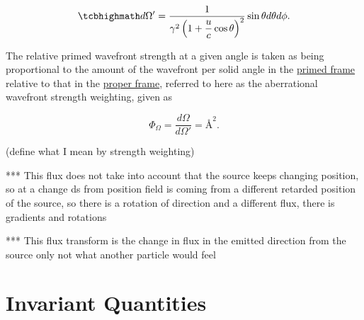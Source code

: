 \begin{equation}
	\mhl{
		d\Omega{'} = \dfrac{1}{{\gamma}^2\left(1 + \dfrac{u}{c}\cos{\theta}\right)^2} \sin{\theta} d\theta d\phi.
	}
\end{equation}

The relative primed wavefront strength at a given angle is taken as being proportional to the amount of the wavefront per solid angle in the \hyperlink{def-Primed-Frame}{primed frame} relative to that in the \hyperlink{def-proper-frame}{proper frame}, referred to here as the aberrational wavefront strength weighting, given as

\begin{equation}
	\label{eq: aberrational wavefront weighting}
	\Phi_\Omega = \frac{d\Omega}{d\Omega'} = \text{\AA}^2.
\end{equation}

(define what I mean by strength weighting)

*** This flux does not take into account that the source keeps changing position, so at a change ds from position field is coming from a different retarded position of the source, so there is a rotation of direction and a different flux, there is gradients and rotations

*** This flux transform is the change in flux in the emitted direction from the source only not what another particle would feel



\printbibliography[segment=\therefsegment, heading=subbibliography]

\chapter{Invariant Quantities} \label{ch: Invariant Quantities}

